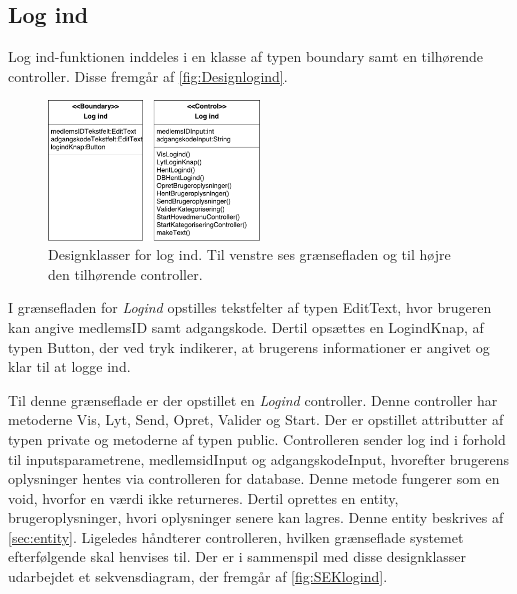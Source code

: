 \subsection*{Log ind}
Log ind-funktionen inddeles i en klasse af typen boundary samt en tilhørende controller. Disse fremgår af \autoref{fig:Designlogind}. 

\begin{figure} [H]
\centering
\includegraphics[width=0.5\textwidth]{figures/MVC/MVCLogInd}
\caption{Designklasser for log ind. Til venstre ses grænsefladen og til højre den tilhørende controller.}
\label{fig:Designlogind}
\end{figure}

\noindent
I grænsefladen for \textit{Logind} opstilles tekstfelter af typen EditText, hvor brugeren kan angive medlemsID samt adgangskode. Dertil opsættes en LogindKnap, af typen Button, der ved tryk indikerer, at brugerens informationer er angivet og klar til at logge ind. 

Til denne grænseflade er der opstillet en \textit{Logind} controller. Denne controller har metoderne Vis, Lyt, Send, Opret, Valider og Start. Der er opstillet attributter af typen private og metoderne af typen public. Controlleren sender log ind i forhold til inputsparametrene, medlemsidInput og adgangskodeInput, hvorefter brugerens oplysninger hentes via controlleren for database. Denne metode fungerer som en void, hvorfor en værdi ikke returneres. Dertil oprettes en entity, brugeroplysninger, hvori oplysninger senere kan lagres. Denne entity beskrives af \autoref{sec:entity}. Ligeledes håndterer controlleren, hvilken grænseflade systemet efterfølgende skal henvises til. Der er i sammenspil med disse designklasser udarbejdet et sekvensdiagram, der fremgår af \autoref{fig:SEKlogind}.


